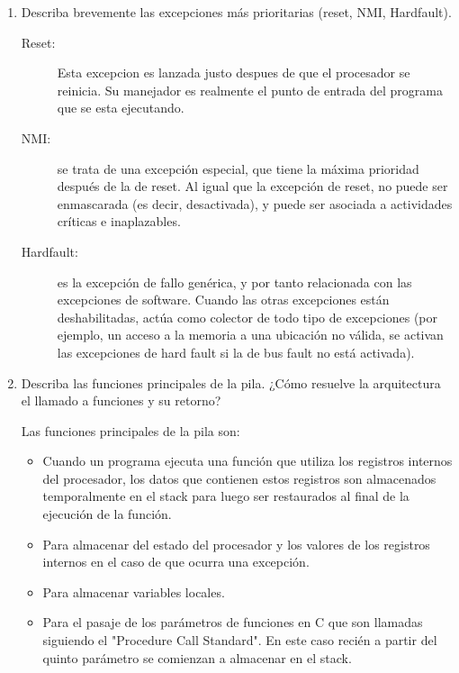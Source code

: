 \documentclass[12pt, a4paper]{article}
\makeatletter
\newcommand\setItemnumber[1]{\setcounter{enum\romannumeral\@enumdepth}{\numexpr#1-1\relax}}
\makeatother
\begin{document}
\begin{enumerate}
    \setItemnumber{9}
    \item Describa brevemente las excepciones más prioritarias (reset, NMI, Hardfault).
    
    \begin{description}
        \item [Reset:] Esta excepcion es lanzada justo despues de que el procesador se reinicia.
        Su manejador es realmente el punto de entrada del programa que se esta ejecutando.
        \item[NMI:] se trata de una excepción especial, que tiene la máxima prioridad después de 
        la de reset. Al igual que la excepción de reset, no puede ser enmascarada (es decir, desactivada), 
        y puede ser asociada a actividades críticas e inaplazables.
        \item[Hardfault:] es la excepción de fallo genérica, y por tanto relacionada con las excepciones de 
        software. Cuando las otras excepciones están deshabilitadas, actúa como colector de todo tipo de 
        excepciones (por ejemplo, un acceso a la memoria a una ubicación no válida, se activan las 
        excepciones de hard fault si la de bus fault no está activada).
        
    \end{description}
    
    \setItemnumber{10} 
    \item Describa las funciones principales de la pila. ¿Cómo resuelve la arquitectura el llamado 
    a funciones y su retorno?
    
    Las funciones principales de la pila son:
    
    \begin{itemize}
        \item Cuando un programa ejecuta una función que utiliza los registros internos del procesador, 
        los datos que contienen estos registros son almacenados temporalmente en el stack para luego ser
        restaurados al final de la ejecución de la función.
        \item Para almacenar del estado del procesador y los valores de los registros internos en 
        el caso de que ocurra una excepción.
        \item Para almacenar variables locales.
        \item Para el pasaje de los parámetros de funciones en C que son llamadas siguiendo 
        el "Procedure Call Standard". En este caso recién a partir del quinto parámetro se 
        comienzan a almacenar en el stack.
     \end{itemize}
    

\end{enumerate}
\end{document}
